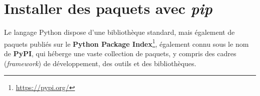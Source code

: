 \section{Installer des paquets avec \textit{pip}}
Le langage Python dispose d'une bibliothèque standard, mais également de paquets publiés sur le \textbf{Python Package Index}\footnote{\url{https://pypi.org/}}, également connu sous le nom de \textbf{PyPI}, qui  héberge une vaste collection de paquets, y compris des cadres (\textit{framework}) de développement, des outils et des bibliothèques.
